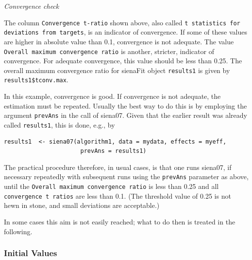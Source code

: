 \documentclass[a4paper,fleqn,11pt]{article}
\newcommand{\+}{\, + \,}
\newcommand{\sfn}[1]{\textsf{#1}}
\begin{document}
\emph{Convergence check}
\smallskip

\noindent
The column \texttt{\small Convergence t-ratio} shown above, also
called \texttt{\small t statistics for deviations from targets},
is an indicator of convergence. If some of these values
are higher in absolute value than 0.1, convergence is not adequate.
The value \texttt{Overall maximum convergence ratio} is another, stricter,
indicator of convergence.
For adequate convergence, this value should be less than 0.25.
The overall maximum convergence ratio for \sfn{sienaFit} object \texttt{results1}
is given by  \texttt{results1\$tconv.max}.

In this example, convergence is good.
If convergence is not adequate, the estimation must be repeated.
Usually the best way to do this is by employing the
argument \texttt{prevAns} in the call of \sfn{siena07}.
Given that the earlier result was already called \texttt{results1},
this is done, e.g., by
\begin{verbatim}
results1  <- siena07(algorithm1, data = mydata, effects = myeff,
                      prevAns = results1)
\end{verbatim}
The practical procedure therefore, in usual cases, is that
one runs \sfn{siena07}, if necessary repeatedly with
subsequent runs using the \texttt{prevAns} parameter as above,
until the \texttt{Overall maximum convergence ratio} is less than 0.25
and all  \texttt{\small convergence t ratios}
are less than 0.1.
(The threshold value of 0.25 is not hewn in stone,
and small deviations are acceptable.)

In some cases this aim is not easily reached;
what to do then is treated in the following.

\subsubsection{Initial Values}
\label{S_initials}
\end{document}
